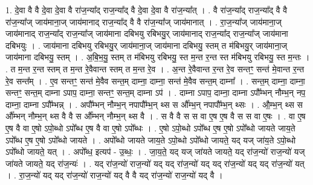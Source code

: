 \documentclass[17pt]{extarticle}
\begin{document}
1. दे॒वा वै वै दे॒वा दे॒वा वै रा॑ज॒न्या᳚द् राज॒न्या᳚द् वै दे॒वा दे॒वा वै रा॑ज॒न्या᳚त् । . वै रा॑ज॒न्या᳚द् राज॒न्या᳚द् वै वै रा॑ज॒न्या᳚ज् जाय॑माना॒ज् जाय॑मानाद् राज॒न्या᳚द् वै वै रा॑ज॒न्या᳚ज् जाय॑मानात् । . रा॒ज॒न्या᳚ज् जाय॑माना॒ज् जाय॑मानाद् राज॒न्या᳚द् राज॒न्या᳚ज् जाय॑माना दबिभयु रबिभयु॒र् जाय॑मानाद् राज॒न्या᳚द् राज॒न्या᳚ज् जाय॑माना दबिभयुः । . जाय॑माना दबिभयु रबिभयु॒र् जाय॑माना॒ज् जाय॑माना दबिभयु॒ स्तम् त म॑बिभयु॒र् जाय॑माना॒ज् जाय॑माना दबिभयु॒ स्तम् । . अ॒बि॒भ॒यु॒ स्तम् त म॑बिभयु रबिभयु॒ स्त म॒न्त र॒न्त स्त म॑बिभयु रबिभयु॒ स्त म॒न्तः । . त म॒न्त र॒न्त स्तम् त म॒न्त रे॒वैवान्त स्तम् त म॒न्त रे॒व । . अ॒न्त रे॒वैवान्त र॒न्त रे॒व सन्तꣳ॒॒ सन्त॑ मे॒वान्त र॒न्त रे॒व सन्त᳚म् । . ए॒व सन्तꣳ॒॒ सन्त॑ मे॒वैव सन्त॒म् दाम्ना॒ दाम्ना॒ सन्त॑ मे॒वैव सन्त॒म् दाम्ना᳚ । . सन्त॒म् दाम्ना॒ दाम्ना॒ सन्तꣳ॒॒ सन्त॒म् दाम्ना ऽपाप॒ दाम्ना॒ सन्तꣳ॒॒ सन्त॒म् दाम्ना ऽप॑ । . दाम्ना ऽपाप॒ दाम्ना॒ दाम्ना ऽपौ᳚म्भन् नौम्भ॒न् नप॒ दाम्ना॒ दाम्ना ऽपौ᳚म्भन्न् । . अपौ᳚म्भन् नौम्भ॒न् नपापौ᳚म्भ॒न् थ्स स औ᳚म्भ॒न् नपापौ᳚म्भ॒न् थ्सः । . औ॒म्भ॒न् थ्स स औ᳚म्भन् नौम्भ॒न् थ्स वै वै स औ᳚म्भन् नौम्भ॒न् थ्स वै । . स वै वै स स वा ए॒ष ए॒ष वै स स वा ए॒षः । . वा ए॒ष ए॒ष वै वा ए॒षो ऽपो॒ब्धो ऽपो᳚ब्ध ए॒ष वै वा ए॒षो ऽपो᳚ब्धः । . ए॒षो ऽपो॒ब्धो ऽपो᳚ब्ध ए॒ष ए॒षो ऽपो᳚ब्धो जायते जाय॒ते ऽपो᳚ब्ध ए॒ष ए॒षो ऽपो᳚ब्धो जायते । . अपो᳚ब्धो जायते जाय॒ते ऽपो॒ब्धो ऽपो᳚ब्धो जायते॒ यद् यज् जा॑य॒ते ऽपो॒ब्धो ऽपो᳚ब्धो जायते॒ यत् । . अपो᳚ब्ध॒ इत्यप॑ - उ॒ब्धः॒ । . जा॒य॒ते॒ यद् यज् जा॑यते जायते॒ यद् रा॑ज॒न्यो॑ राज॒न्यो॑ यज् जा॑यते जायते॒ यद् रा॑ज॒न्यः॑ । . यद् रा॑ज॒न्यो॑ राज॒न्यो॑ यद् यद् रा॑ज॒न्यो॑ यद् यद् रा॑ज॒न्यो॑ यद् यद् रा॑ज॒न्यो॑ यत् । . रा॒ज॒न्यो॑ यद् यद् रा॑ज॒न्यो॑ राज॒न्यो॑ यद् वै वै यद् रा॑ज॒न्यो॑ राज॒न्यो॑ यद् वै । \newline
\end{document}
